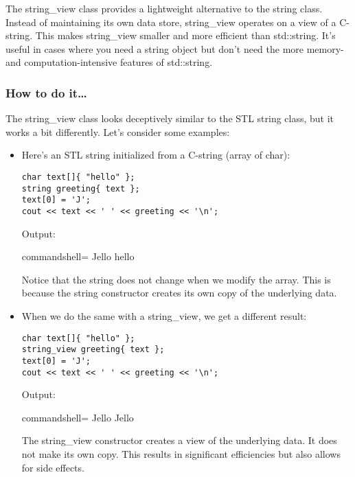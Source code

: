 
The string\_view class provides a lightweight alternative to the string class. Instead of maintaining its own data store, string\_view operates on a view of a C-string. This makes string\_view smaller and more efficient than std::string. It's useful in cases where you need a string object but don't need the more memory- and computation-intensive features of std::string.

\subsubsection{How to do it…}

The string\_view class looks deceptively similar to the STL string class, but it works a bit differently. Let's consider some examples:

\begin{itemize}
\item 
Here's an STL string initialized from a C-string (array of char):

\begin{lstlisting}[style=styleCXX]
char text[]{ "hello" };
string greeting{ text };
text[0] = 'J';
cout << text << ' ' << greeting << '\n';
\end{lstlisting}

Output:

\begin{tcblisting}{commandshell={}}
Jello hello
\end{tcblisting}

Notice that the string does not change when we modify the array. This is because the string constructor creates its own copy of the underlying data.

\item 
When we do the same with a string\_view, we get a different result:

\begin{lstlisting}[style=styleCXX]
char text[]{ "hello" };
string_view greeting{ text };
text[0] = 'J';
cout << text << ' ' << greeting << '\n';
\end{lstlisting}

Output:

\begin{tcblisting}{commandshell={}}
Jello Jello
\end{tcblisting}

The string\_view constructor creates a view of the underlying data. It does not make its own copy. This results in significant efficiencies but also allows for side effects.


\end{itemize}
